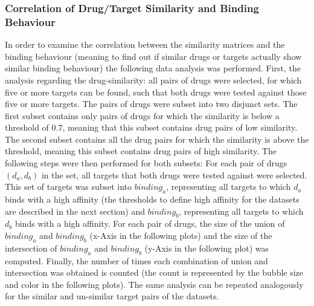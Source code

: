 \subsubsection{Correlation of Drug/Target Similarity and Binding Behaviour}
In order to examine the correlation between the similarity matrices and the binding behaviour (meaning to find out if similar drugs or targets actually show similar binding behaviour) the following data analysis was performed. First, the analysis regarding the drug-similarity: all pairs of drugs were selected, for which five or more targets can be found, such that both drugs were tested against those five or more targets. The pairs of drugs were subset into two disjunct sets. The first subset contains only pairs of drugs for which the similarity is below a threshold of $0.7$, meaning that this subset contains drug pairs of low similarity. The second subset contains all the drug pairs for which the similarity is above the threshold, meaning this subset contains drug pairs of high similarity. The following steps were then performed for both subsets: For each pair of drugs $(d_a,d_b)$ in the set, all targets that both drugs were tested against were selected. This set of targets was subset into $binding_a$, representing all targets to which $d_a$ binds with a high affinity (the thresholds to define high affinity for the datasets are described in the next section) and $binding_b$, representing all targets to which $d_b$ binds with a high affinity. For each pair of drugs, the size of the union of $binding_a$ and $binding_b$ (x-Axis in the following plots) and the size of the intersection of $binding_a$ and $binding_b$ (y-Axis in the following plot) was computed. Finally, the number of times each combination of union and intersection was obtained is counted (the count is represented by the bubble size and color in the following plots). The same analysis can be repeated analogously for the similar and un-similar target pairs of the datasets.

